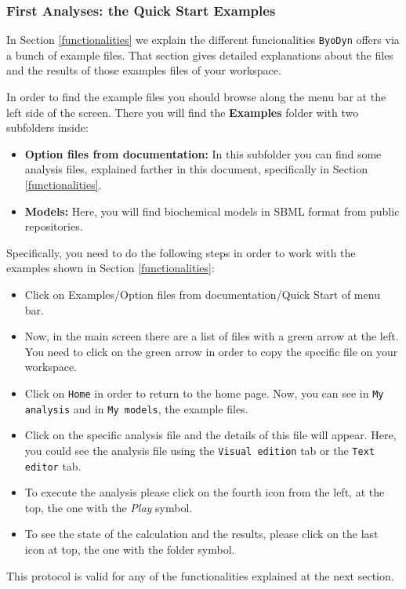 \documentclass[a4paper, 11pt]{article}
\begin{document}
  \subsubsection{First Analyses: the Quick Start Examples}
  In Section \ref{functionalities} we explain the different funcionalities \texttt{ByoDyn} offers via a bunch of example files. 
  That section gives detailed explanations about the files and the results of those examples files of your workspace.

  In order to find the example files you should browse along the menu bar at the left side of the screen. 
  There you will find the \textbf{Examples} folder with two subfolders inside:
  \begin{itemize}
  \item \textbf{Option files from documentation:} 
    In this subfolder you can find some analysis files, explained farther in this document, specifically in Section \ref{functionalities}.
  \item \textbf{Models:} 
    Here, you will find biochemical models in SBML format from public repositories.
  \end{itemize}
  Specifically, you need to do the following steps in order to work with the examples shown in Section \ref{functionalities}:
  \begin{itemize}
  \item
    Click on Examples/Option files from documentation/Quick Start of menu bar. 
  \item 
    Now, in the main screen there are a list of files with a green arrow at the left. 
    You need to click on the green arrow in order to copy the specific file on your workspace.
  \item 
    Click on \texttt{Home} in order to return to the home page. 
    Now, you can see in \texttt{My analysis} and in \texttt{My models}, the example files.
  \item 
    Click on the specific analysis file and the details of this file will appear. 
    Here, you could see the analysis file using the \texttt{Visual edition} tab or the \texttt{Text editor} tab.
  \item 
    To execute the analysis please click on the fourth icon from the left, at the top, the one with the \emph{Play} symbol. 
  \item 
    To see the state of the calculation and the results, please click on the last icon at top, the one with the folder symbol.
  \end{itemize}
  This protocol is valid for any of the functionalities explained at the next section.
\end{document}
